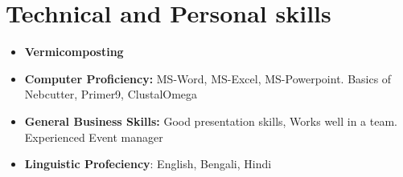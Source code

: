 \documentclass[11pt,a4paper,sans]{moderncv}
\begin{document}
\section{Technical and Personal skills}

\vspace{6pt}

\begin{itemize}

\item \textbf{Vermicomposting}
\vspace{6pt}
\item \textbf{Computer Proficiency:} MS-Word, MS-Excel, MS-Powerpoint. Basics of Nebcutter, Primer9, ClustalOmega

\vspace{6pt}


\item \textbf{General Business Skills:} Good presentation skills, Works well in a team. Experienced Event manager
\vspace{6pt}
\item \textbf{Linguistic Profeciency}: English, Bengali, Hindi
\end{itemize}
\end{document}
